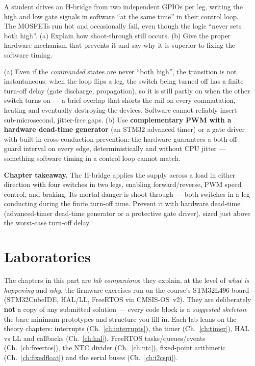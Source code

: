 \documentclass[11pt,a4paper,oneside]{book}
\begin{document}
\begin{exercise}
A student drives an H-bridge from two independent GPIOs per leg, writing the high
and low gate signals in software ``at the same time'' in their control loop. The
MOSFETs run hot and occasionally fail, even though the logic ``never sets both
high''. (a) Explain how shoot-through still occurs. (b) Give the proper hardware
mechanism that prevents it and say why it is superior to fixing the software
timing.
\end{exercise}
\begin{solution}
(a) Even if the \emph{commanded} states are never ``both high'', the transition is
not instantaneous: when the loop flips a leg, the switch being turned off has a
finite turn-off delay (gate discharge, propagation), so it is still partly on when
the other switch turns on --- a brief overlap that shorts the rail on every
commutation, heating and eventually destroying the devices. Software cannot
reliably insert sub-microsecond, jitter-free gaps. (b) Use \textbf{complementary
PWM with a hardware dead-time generator} (an STM32 advanced timer) or a gate
driver with built-in cross-conduction prevention: the hardware guarantees a
both-off guard interval on every edge, deterministically and without CPU jitter
--- something software timing in a control loop cannot match.
\end{solution}

\begin{keyidea}
\textbf{Chapter takeaway.} The H-bridge applies the supply across a load in either
direction with four switches in two legs, enabling forward/reverse, PWM speed
control, and braking. Its mortal danger is shoot-through --- both switches in a
leg conducting during the finite turn-off time. Prevent it with hardware
dead-time (advanced-timer dead-time generator or a protective gate driver), sized
just above the worst-case turn-off delay.
\end{keyidea}

\part{Laboratories}

The chapters in this part are \emph{lab companions}: they explain, at the level of
\emph{what is happening} and \emph{why}, the firmware exercises run on the course's
STM32L496 board (STM32CubeIDE, HAL/LL, FreeRTOS via CMSIS-OS~v2). They
are deliberately \textbf{not} a copy of any submitted solution --- every code block
is a \emph{suggested skeleton}: the bare-minimum prototypes and structure you fill
in. Each lab leans on the theory chapters: interrupts
(Ch.~\ref{ch:interrupts}), the timer (Ch.~\ref{ch:timer}), HAL vs LL and callbacks
(Ch.~\ref{ch:hal}), FreeRTOS tasks/queues/events (Ch.~\ref{ch:freertos}), the NTC
divider (Ch.~\ref{ch:ntc}), fixed-point arithmetic (Ch.~\ref{ch:fixedfloat}) and
the serial buses (Ch.~\ref{ch:i2cspi}).
\end{document}
